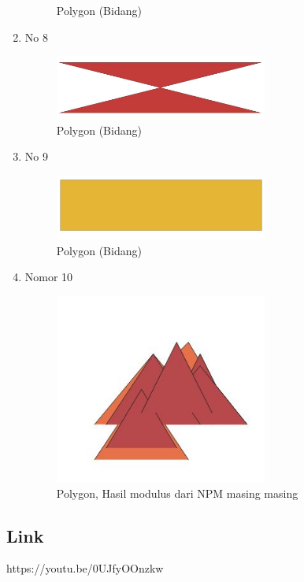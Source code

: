 \begin{enumerate}
\begin{figure}[H]
		\centering
		\caption{Polygon (Bidang)}
	\end{figure}
	\item No 8
	
	\begin{figure}[H]
		\includegraphics[width=7cm]{figures/Tugas2/1174080/no8.JPG}
		\centering
		\caption{Polygon (Bidang)}
	\end{figure}
	\item No 9
	
	\begin{figure}[H]
		\includegraphics[width=7cm]{figures/Tugas2/1174080/no9.JPG}
		\centering
		\caption{Polygon (Bidang)}
	\end{figure}
	\item Nomor 10
	
	\begin{figure}[H]
		\includegraphics[width=7cm]{figures/Tugas2/1174080/no10.JPG}
		\centering
		\caption{Polygon, Hasil modulus dari NPM masing masing}
	\end{figure}
\end{enumerate}
\subsection{Link}
https://youtu.be/0UJfyOOnzkw